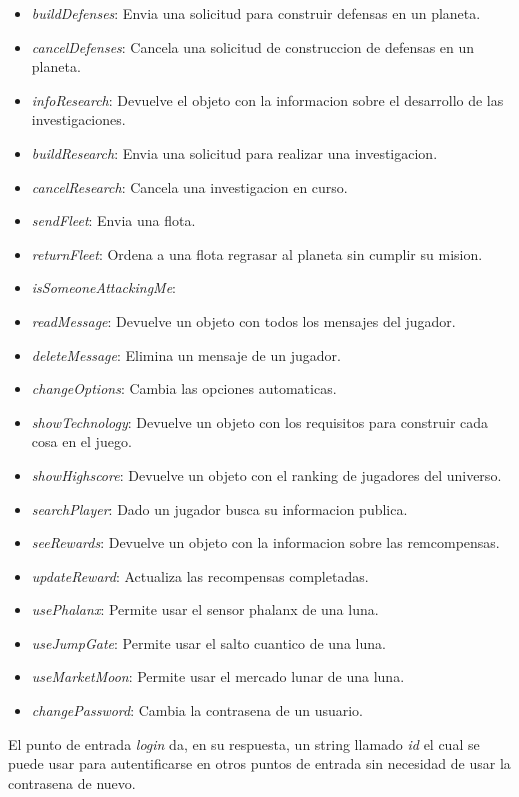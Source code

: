 \documentclass{article}
\begin{document}
\begin{itemize}[noitemsep]
    \item \textit{buildDefenses}: Envia una solicitud para construir defensas en un planeta.
    \item \textit{cancelDefenses}: Cancela una solicitud de construccion de defensas en un planeta.
    \item \textit{infoResearch}: Devuelve el objeto con la informacion sobre el desarrollo de las investigaciones.
    \item \textit{buildResearch}: Envia una solicitud para realizar una investigacion.
    \item \textit{cancelResearch}: Cancela una investigacion en curso.
    \item \textit{sendFleet}: Envia una flota.
    \item \textit{returnFleet}: Ordena a una flota regrasar al planeta sin cumplir su mision.
    \item \textit{isSomeoneAttackingMe}: %
    \item \textit{readMessage}: Devuelve un objeto con todos los mensajes del jugador.
    \item \textit{deleteMessage}: Elimina un mensaje de un jugador.
    \item \textit{changeOptions}: Cambia las opciones automaticas.
    \item \textit{showTechnology}: Devuelve un objeto con los requisitos para construir cada cosa en el juego.
    \item \textit{showHighscore}: Devuelve un objeto con el ranking de jugadores del universo.
    \item \textit{searchPlayer}: Dado un jugador busca su informacion publica.
    \item \textit{seeRewards}: Devuelve un objeto con la informacion sobre las remcompensas.
    \item \textit{updateReward}: Actualiza las recompensas completadas.
    \item \textit{usePhalanx}: Permite usar el sensor phalanx de una luna.
    \item \textit{useJumpGate}: Permite usar el salto cuantico de una luna.
    \item \textit{useMarketMoon}: Permite usar el mercado lunar de una luna.
    \item \textit{changePassword}: Cambia la contrasena de un usuario.
\end{itemize}

El punto de entrada \textit{login} da, en su respuesta, un string llamado \textit{id} el cual se puede usar para autentificarse en otros puntos de entrada sin necesidad de usar la contrasena de nuevo.
\end{document}
